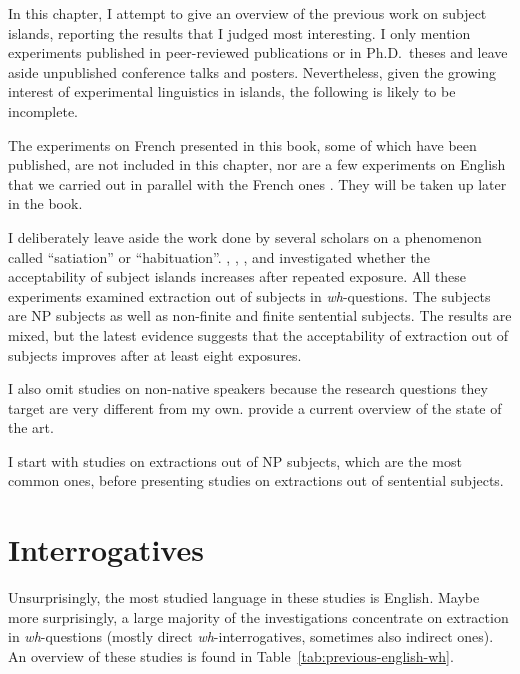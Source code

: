 \label{ch:previous-exp}

In this chapter, I attempt to give an overview of the previous work on subject islands, reporting the results that I judged most interesting. I only mention experiments published in peer-reviewed publications or in Ph.D.\ theses and leave aside unpublished conference talks and posters. Nevertheless, given the growing interest of experimental linguistics in islands, the following is likely to be incomplete.

The experiments on French presented in this book, some of which have been published, are not included in this chapter, nor are a few experiments on English that we carried out in parallel with the French ones \citep{Abeille.2019.Quasy,Abeille.2020.Cognition}. They will be taken up later in the book.

I deliberately leave aside the work done by several scholars on a phenomenon called ``satiation'' or ``habituation''. \citet{Sprouse.2007.PhD,Sprouse.2007.Acceptability,Sprouse.2009}, \citet{Francom.2011}, \citet{Goodall.2011}, \citet{Chaves.2014,Chaves.2019.Frequency} and \citet{Chaves.2020.UDC} investigated whether the acceptability of subject islands increases after repeated exposure. All these experiments examined extraction out of subjects in \textit{wh}-questions. The subjects are NP subjects as well as non-finite and finite sentential subjects. The results are mixed, but the latest evidence suggests that the acceptability of extraction out of subjects improves after at least eight exposures.

I also omit studies on non-native speakers because the research questions they target are very different from my own. \citet{Kush.2022} provide a current overview of the state of the art.

I start with studies on extractions out of NP subjects, which are the most common ones, before presenting studies on extractions out of sentential subjects.

\section{Interrogatives}
\label{ch:previous-wh}

Unsurprisingly, the most studied language in these studies is English. Maybe more surprisingly, a large majority of the investigations concentrate on extraction in \textit{wh}-questions (mostly direct \textit{wh}-interrogatives, sometimes also indirect ones). An overview of these studies is found in Table~\ref{tab:previous-english-wh}.

